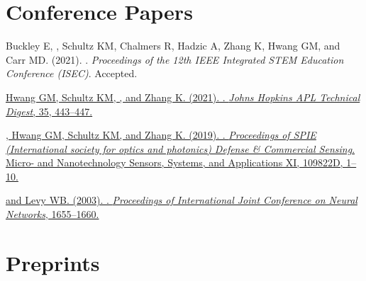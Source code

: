 \section*{Conference Papers}

\begin{description}
  \item Buckley E, , Schultz KM, Chalmers R, Hadzic A, Zhang
      K, Hwang GM, and Carr MD. (2021). .
      \emph{Proceedings of the 12th IEEE Integrated STEM Education Conference
    (ISEC)}. Accepted.
  \item \href{https://www.jhuapl.edu/Content/techdigest/pdf/V35-N04/35-04-Hwang.pdf}
    {Hwang GM, Schultz KM, , and Zhang K. (2021).
    . \emph{Johns Hopkins
    APL Technical Digest}, 35, 443--447.}
  \item \href{https://dx.doi.org/10.1117/12.2518966}
    {, Hwang GM, Schultz KM, and Zhang K. (2019).
    . \emph{Proceedings of SPIE (International society
      for optics and photonics) Defense \& Commercial Sensing}. Micro- and
      Nanotechnology Sensors, Systems, and Applications XI, 109822D, 1--10.
    }
  \item \href{https://dx.doi.org/10.1109/IJCNN.2003.1223655}
    { and Levy WB. (2003). . \emph{Proceedings of
      International Joint Conference on Neural Networks}, 1655--1660.
    }
\end{description}

\section*{Preprints}


